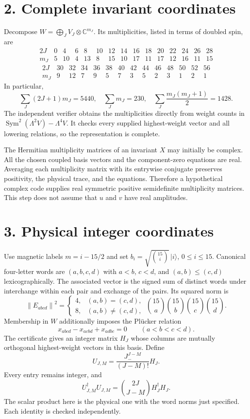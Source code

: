 \documentclass[11pt]{article}
\newcommand{\Sym}{\operatorname{Sym}}
\begin{document}
\section*{2. Complete invariant coordinates}
Decompose $W=\bigoplus_J V_J\otimes\mathbb C^{m_J}$. Its multiplicities, listed in terms of doubled spin, are
\[
\begin{array}{c|rrrrrrrrrrrrrr}
2J&0&4&6&8&10&12&14&16&18&20&22&24&26&28\\\hline
m_J&5&10&4&13&8&15&10&17&11&17&12&16&11&15
\end{array}
\]
\[
\begin{array}{c|rrrrrrrrrrrrr}
2J&30&32&34&36&38&40&42&44&46&48&50&52&56\\\hline
m_J&9&12&7&9&5&7&3&5&2&3&1&2&1
\end{array}
\]
In particular,
\[
 \sum_J(2J+1)m_J=5440,\quad \sum_Jm_J=230,
 \quad \sum_J\frac{m_J(m_J+1)}2=1428.
\]
The independent verifier obtains the multiplicities directly from weight counts in $\Sym^2(\Lambda^2V)-\Lambda^4V$. It checks every supplied highest-weight vector and all lowering relations, so the representation is complete.

The Hermitian multiplicity matrices of an invariant $X$ may initially be complex. All the chosen coupled basis vectors and the component-zero equations are real. Averaging each multiplicity matrix with its entrywise conjugate preserves positivity, the physical trace, and the equations. Therefore a hypothetical complex code supplies real symmetric positive semidefinite multiplicity matrices. This step does not assume that $u$ and $v$ have real amplitudes.

\section*{3. Physical integer coordinates}
Use magnetic labels $m=i-15/2$ and set
$b_i=\sqrt{\binom{15}{i}}\,|i\rangle$, $0\le i\le15$.
Canonical four-letter words are $(a,b,c,d)$ with $a<b$, $c<d$, and $(a,b)\le(c,d)$ lexicographically. The associated vector is the signed sum of distinct words under interchange within each pair and exchange of the pairs. Its squared norm is
\[
 \left\|E_{abcd}\right\|^2=
 \begin{cases}4,&(a,b)=(c,d),\\8,&(a,b)\ne(c,d),\end{cases}
 \ \binom{15}{a}\binom{15}{b}\binom{15}{c}\binom{15}{d}.
\]
Membership in $W$ additionally imposes the Pl\"ucker relation
\[
 x_{abcd}-x_{acbd}+x_{adbc}=0\qquad(a<b<c<d).
\]
The certificate gives an integer matrix $H_J$ whose columns are mutually orthogonal highest-weight vectors in this basis. Define
\[
 U_{J,M}=\frac{J_-^{J-M}}{(J-M)!}H_J.
\]
Every entry remains integer, and
\[
 U_{J,M}^\dagger U_{J,M}
 =\binom{2J}{J-M}H_J^\dagger H_J.
\]
The scalar product here is the physical one with the word norms just specified. Each identity is checked independently.
\end{document}
